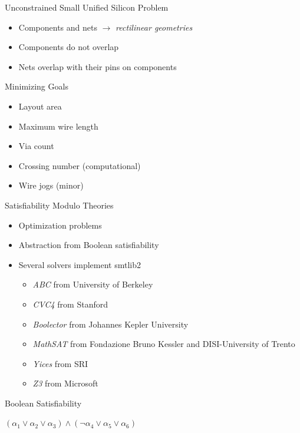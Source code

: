 \documentclass[aspectratio=169]{beamer}
\begin{document}
\begin{frame}{Unconstrained Small Unified Silicon Problem}
	\begin{itemize}
        \setlength\itemsep{1em}
		\item Components and nets $\rightarrow$ \textit{rectilinear geometries}
		\item Components do not overlap
		\item Nets overlap with their pins on components
	\end{itemize}
\end{frame}

\begin{frame}{Minimizing Goals}
	\begin{itemize}
        \setlength\itemsep{1em}
		\item Layout area
		\item Maximum wire length 
		\item Via count
		\item Crossing number (computational)
		\item Wire jogs (minor)
	\end{itemize}
\end{frame}

\begin{frame}{Satisfiability Modulo Theories}
	\begin{itemize}
        \setlength\itemsep{1em}
            \item Optimization problems
            \item Abstraction from Boolean satisfiability
            \item Several solvers implement smtlib2
	    \begin{itemize}
                \item \textit{ABC} from University of Berkeley
                \item \textit{CVC4} from Stanford
                \item \textit{Boolector} from Johannes Kepler University
                \item \textit{MathSAT} from Fondazione Bruno Kessler and DISI-University of Trento
                \item \textit{Yices} from SRI
                \item \textit{Z3} from Microsoft
	    \end{itemize}
	\end{itemize}
\end{frame}

\begin{frame}{Boolean Satisfiability}
    \begin{center}
        $ ( \alpha_{1} \vee \alpha_{2} \vee \alpha_{3} )
    \land ( \neg \alpha_{4} \vee \alpha_{5} \vee \alpha_{6} )
        $
    \end{center}
\end{frame}
\end{document}
